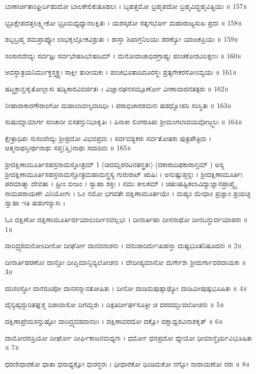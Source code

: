 ಬಾಣಾರ್ಚಿತಾಂಘ್ರಿರ್ಬಹುದೋ ಬಾಲಕೇಲಿಕುತೂಹಲಃ ।
ಬೃಹತ್ತಮೋ ಬ್ರಹ್ಮಪದೋ ಬ್ರಹ್ಮವಿದ್ಬ್ರಹ್ಮವಿತ್ಪ್ರಿಯಃ ॥ 157॥

ಭ್ರೂಕ್ಷೇಪದತ್ತಲಕ್ಷ್ಮೀಕೋ ಭ್ರೂಮಧ್ಯಧ್ಯಾನಲಕ್ಷಿತಃ ।
ಯಶಸ್ಕರೋ ರತ್ನಗರ್ಭೋ ಮಹಾರಾಜ್ಯಸುಖ ಪ್ರದಃ ॥ 158॥

ಶಬ್ದಬ್ರಹ್ಮ ಶಮಪ್ರಾಪ್ಯೋ ಲಾಭಕೃಲ್ಲೋಕವಿಶ್ರುತಃ ।
ಶಾಸ್ತಾ ಶಿಖಾಗ್ರನಿಲಯಃ ಶರಣ್ಯೋ ಯಾಜಕಪ್ರಿಯಃ ॥ 159॥

ಸಂಸಾರವೇದ್ಯಃ ಸರ್ವಜ್ಞಃ ಸರ್ವಭೇಷಜಭೇಷಜಮ್ ।
ಮನೋವಾಚಾಭಿರಗ್ರಾಹ್ಯಃ ಪಂಚಕೋಶವಿಲಕ್ಷಣಃ ॥ 160॥

ಅವಸ್ಥಾತ್ರಯನಿರ್ಮುಕ್ತಸ್ತ್ವಕ್ಸ್ಥಃ ಸಾಕ್ಷೀ ತುರೀಯಕಃ ।
ಪಂಚಭೂತಾದಿದೂರಸ್ಥಃ ಪ್ರತ್ಯಗೇಕರಸೋಽವ್ಯಯಃ ॥ 161॥

ಷಟ್ಚಕ್ರಾನ್ತಃಕೃತೋಲ್ಲಾಸಃ ಷಡ್ವಿಕಾರವಿವರ್ಜಿತಃ ।
ವಿಜ್ಞಾನಘನಸಮ್ಪೂರ್ಣೋ ವೀಣಾವಾದನತತ್ಪರಃ ॥ 162॥

ನೀಹಾರಾಕಾರಗೌರಾಂಗೋ ಮಹಾಲಾವಣ್ಯವಾರಿಧಿಃ ।
ಪರಾಭಿಚಾರಶಮನಃ ಷಡಧ್ವೋಪರಿ ಸಂಸ್ಥಿತಃ ॥ 163॥

ಸುಷುಮ್ನಾಮಾರ್ಗ ಸಂಚಾರೀ ಬಿಸತನ್ತುನಿಭಾಕೃತಿಃ ।
ಪಿನಾಕೀ ಲಿಂಗರೂಪಃ ಶ್ರೀಮಂಗಲಾವಯವೋಜ್ಜ್ವಲಃ ॥ 164॥

ಕ್ಷೇತ್ರಾಧಿಪಃ ಸುಸಂವೇದ್ಯಃ ಶ್ರೀಪ್ರದೋ ವಿಭವಪ್ರದಃ ।
ಸರ್ವವಶ್ಯಕರಃ ಸರ್ವತೋಷಕಃ ಪುತ್ರಪೌತ್ರಿದಃ ।
ಆತ್ಮನಾಥಸ್ತೀರ್ಥನಾಥಃ ಸಪ್ತ(ಪ್ತಿ)ನಾಥಃ ಸದಾಶಿವಃ ॥ 165॥




ಶ್ರೀದಕ್ಷಿಣಾಮೂರ್ತಿಸಹಸ್ರನಾಮಸ್ತೋತ್ರಮ್ 1 
(ಚಿದಮ್ಬರನಟನತನ್ತ್ರತಃ)
(ದಕಾರಾದಿಥಕಾರಾನ್ತಮ್ )
ಅಸ್ಯ ಶ್ರೀದಕ್ಷಿಣಾಮೂರ್ತಿಸಹಸ್ರನಾಮಸ್ತೋತ್ರಮಹಾಮನ್ತ್ರಸ್ಯ ಗುರುರಾಟ್ ಋಷಿಃ ।
ಅನುಷ್ಟುಪ್ಛನ್ದಃ । ಶ್ರೀದಕ್ಷಿಣಾಮೂರ್ತಿಃ ಪರಮಾತ್ಮಾ ದೇವತಾ ।
ಹ್ರೀಂ ಬೀಜಂ । ಸ್ವಾಹಾ ಶಕ್ತಿಃ । ನಮಃ ಕೀಲಕಮ್ ।
ಚತುಃಷಷ್ಟಿಕಲಾವಿದ್ಯಾಜ್ಞಾನಪ್ರಾಪ್ತ್ಯೈ ನಾಮಪರಾಯಣೇ ವಿನಿಯೋಗಃ ।
ಓಂ ನಮೋ ಭಗವತೇ ದಕ್ಷಿಣಾಮೂರ್ತಯೇ ।
ಮಹ್ಯಂ ಮೇಧಾಂ ಪ್ರಜ್ಞಾಂ ಪ್ರಯಚ್ಛ ಸ್ವಾಹಾ ಇತಿ ಷಡಂಗನ್ಯಾಸಃ ।

ಓಂ ದಕ್ಷಿಣೋ ದಕ್ಷಿಣಾಮೂರ್ತಿರ್ದಯಾಲುರ್ದೀನವಲ್ಲಭಃ ।
ದೀನಾರ್ತಿಹಾ ದೀನನಾಥೋ ದೀನಬನ್ಧುರ್ದಯಾಪರಃ ॥ 1॥

ದಾರಿದ್ರ್ಯಶಮನೋಽದೀನೋ ದೀರ್ಘೋ ದಾನವನಾಶನಃ ।
ದನುಜಾರಿರ್ದುಃಖಹನ್ತಾ ದುಷ್ಟಭೂತನಿಷೂದನಃ ॥ 2॥

ದೀನಾರ್ತಿಹರಣೋ ದಾನ್ತೋ ದೀಪ್ತಿಮಾನ್ದಿವ್ಯಲೋಚನಃ ।
ದೇದೀಪ್ಯಮಾನೋ ದುರ್ಗೇಶಃ ಶ್ರೀದುರ್ಗಾವರದಾಯಕಃ ॥ 3॥

ದರಿಸಂಸ್ಥೋ ದಾನರೂಪೋ ದಾನಸನ್ಮಾನತೋಷಿತಃ ।
ದೀನೋ ದಾಡಿಮಪುಷ್ಪಾಢ್ಯೋ ದಾಡಿಮೀಪುಷ್ಪಭೂಷಿತಃ ॥ 4॥

ದೈನ್ಯಹೃದ್ದುರಿತಘ್ನಶ್ಚ ದಿಶಾವಾಸೋ ದಿಗಮ್ಬರಃ ।
ದಿಕ್ಪತಿರ್ದೀರ್ಘಸೂತ್ರೀ ಚ ದರದಮ್ಬುದಲೋಚನಃ ॥ 5॥

ದಕ್ಷಿಣಾಪ್ರೇಮಸನ್ತುಷ್ಟೋ ದಾರಿದ್ರ್ಯವಡವಾನಲಃ ।
ದಕ್ಷಿಣಾವರದೋ ದಕ್ಷೋ ದಕ್ಷಾಧ್ವರವಿನಾಶಕೃತ್ ॥ 6॥

ದಾಮೋದರಪ್ರಿಯೋ ದೀರ್ಘೋ ದೀರ್ಘಿಕಾಜನಮಧ್ಯಗಃ ।
ಧರ್ಮೋ ಧನಪ್ರದೋ ಧ್ಯೇಯೋ ಧೀಮಾನ್ಧೈರ್ಯವಿಭೂಷಿತಃ ॥ 7॥

ಧರಣೀಧಾರಕೋ ಧಾತಾ ಧನಾಧ್ಯಕ್ಷೋ ಧುರನ್ಧರಃ ।
ಧೀಧಾರಕೋ ಧಿಂಡಿಮಕೋ ನಗ್ನೋ ನಾರಾಯಣೋ ನರಃ ॥ 8॥

